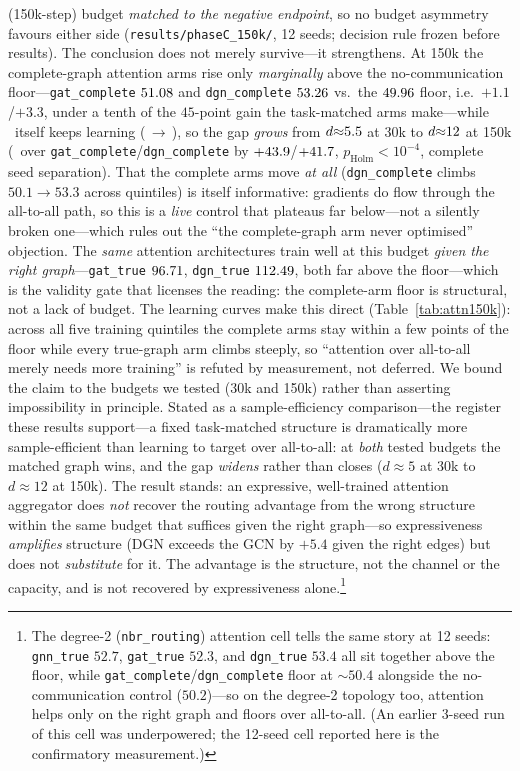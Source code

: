 (150k-step) budget \emph{matched to the negative endpoint}, so no budget
asymmetry favours either side (\texttt{results/phaseC\_150k/}, 12 seeds; decision
rule frozen before results). The conclusion does not merely survive---it
strengthens. At 150k the complete-graph attention arms rise only
\emph{marginally} above the no-communication floor---\texttt{gat\_complete}
$51.08$ and \texttt{dgn\_complete} $53.26$ vs.\ the $49.96$
floor, i.e.\ $+1.1$/$+3.3$, under a tenth of the $45$-point gain the task-matched
arms make---while \gtrue\ itself keeps learning (\SCtrueN$\,\to\,$\SCkTrue), so
the gap \emph{grows} from $d{\approx}5.5$ at 30k to
$d{\approx}12$ at 150k (\gtrue\ over
\texttt{gat\_complete}/\texttt{dgn\_complete} by
$+43.9$/$+41.7$, $p_{\text{Holm}}<10^{-4}$, complete
seed separation). That the complete arms move \emph{at all}
(\texttt{dgn\_complete} climbs $50.1\!\to\!53.3$ across quintiles) is itself
informative: gradients do flow through the all-to-all path, so this is a
\emph{live} control that plateaus far below---not a silently broken one---which
rules out the ``the complete-graph arm never optimised'' objection. The
\emph{same} attention architectures train well
at this budget \emph{given the right graph}---\texttt{gat\_true} $96.71$,
\texttt{dgn\_true} $112.49$, both far above the floor---which is the
validity gate that licenses the reading: the complete-arm floor is structural,
not a lack of budget. The learning curves make this direct
(Table~\ref{tab:attn150k}): across all five training quintiles the complete arms
stay within a few points of the floor while every true-graph arm climbs steeply, so
``attention over all-to-all merely needs more training'' is refuted by
measurement, not deferred. We bound the claim to the budgets we tested (30k and
150k) rather than asserting impossibility in principle. Stated as a
sample-efficiency comparison---the register these results support---a fixed
task-matched structure is dramatically more sample-efficient than learning to
target over all-to-all: at \emph{both} tested budgets the matched graph wins,
and the gap \emph{widens} rather than closes ($d{\approx}5$ at 30k to
$d{\approx}12$ at 150k). The result stands: an
expressive, well-trained attention
aggregator does \emph{not} recover the routing advantage from the wrong
structure within the same budget that suffices given the right graph---so
expressiveness \emph{amplifies} structure (DGN exceeds the GCN by $+5.4$ given
the right edges) but does not \emph{substitute} for it. The advantage is the
structure, not the channel or the capacity, and is not recovered by
expressiveness alone.\footnote{The degree-2 (\texttt{nbr\_routing}) attention
cell tells the same story at 12 seeds: \texttt{gnn\_true} $52.7$,
\texttt{gat\_true} $52.3$, and \texttt{dgn\_true} $53.4$ all sit together
above the floor, while \texttt{gat\_complete}/\texttt{dgn\_complete} floor
at ${\sim}50.4$ alongside the no-communication control ($50.2$)---so on the
degree-2 topology too, attention helps only on the right graph and floors
over all-to-all. (An earlier 3-seed run of this cell was underpowered; the
12-seed cell reported here is the confirmatory measurement.)}


